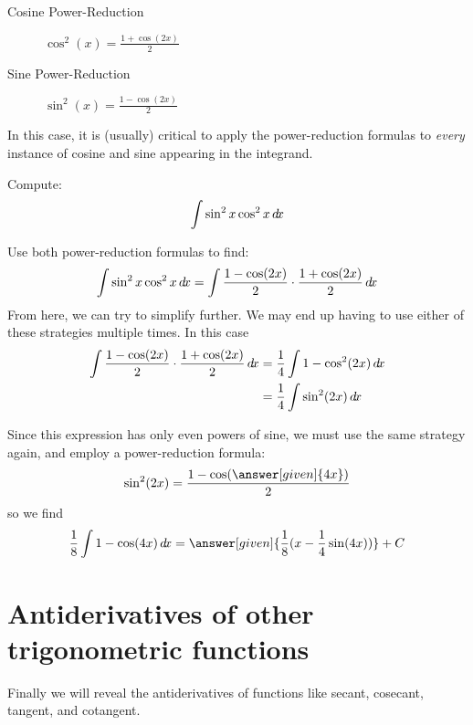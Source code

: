 \documentclass{ximera}
\begin{document}
\begin{description}
\item[Cosine Power-Reduction] $\cos^2(x)= \frac{1+\cos(2x)}{2}$
\item[Sine Power-Reduction] $\sin^2(x) = \frac{1-\cos(2x)}{2}$
\end{description}

In this case, it is (usually) critical to apply the power-reduction
formulas to \textit{every} instance of cosine and sine appearing in
the integrand.

\begin{example}
  Compute:
  \[
  \int \sin^2x\cos^2x\mathop{}\!d\! x
  \]
  \begin{explanation} 
    Use both power-reduction formulas to find:
    \[
    \int \sin^2x\cos^2x\mathop{}\!d\! x=\int \frac{1-\cos(2x)}{2}\cdot
    \frac{1+\cos(2x)}{2}\mathop{}\!d\! x
    \]
    From here, we can try to simplify further.  We may end up having
    to use either of these strategies multiple times.  In this case
    \begin{align*}
      \int \frac{1-\cos(2x)}{2} \cdot \frac{1+\cos(2x)}{2}\mathop{}\!d\! x &= \frac{1}{4} \int 1-\cos^2(2x) \mathop{}\!d\! x\\
      &= \frac{1}{4} \int \sin^2(2x) \mathop{}\!d\! x
    \end{align*}
    
    Since this expression has only even powers of sine, we must use
    the same strategy again, and employ a power-reduction formula:
    \[
    \sin^2(2x) = \frac{1-\cos(\answer[given]{4x})}{2}
    \]
    so we find
    \[
    \frac{1}{8}\int 1-\cos(4x) \d x = \answer[given]{\frac{1}{8}(x - \frac{1}{4}\sin(4x))} + C
    \]
  \end{explanation}
\end{example}


\section{Antiderivatives of other trigonometric functions}

Finally we will reveal the antiderivatives of functions like secant,
cosecant, tangent, and cotangent.
\end{document}
